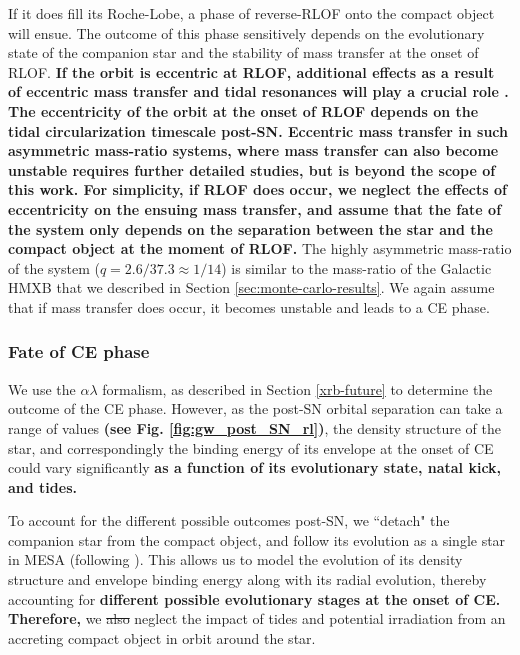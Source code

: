 \documentclass[linenumbers,trackchanges,twocolumn]{aastex701}
\begin{document}
If it does fill its Roche-Lobe, a phase of reverse-RLOF onto the compact object will ensue. The outcome of this phase sensitively depends on the evolutionary state of the companion star and the stability of mass transfer at the onset of RLOF. \textbf{If the orbit is eccentric at RLOF, additional effects as a result of eccentric mass transfer and tidal resonances will play a crucial role \citep{2007ApJ...667.1170S, 2009ApJ...702.1387S, 2010ApJ...724..546S, 2025ApJ...983...39R, 2025arXiv250905243P}. The eccentricity of the orbit at the onset of RLOF depends on the tidal circularization timescale post-SN. Eccentric mass transfer in such asymmetric mass-ratio systems, where mass transfer can also become unstable requires further detailed studies, but is beyond the scope of this work. For simplicity, if RLOF does occur, we neglect the effects of eccentricity on the ensuing mass transfer, and assume that the fate of the system only depends on the separation between the star and the compact object at the moment of RLOF.} The highly asymmetric mass-ratio of the system ($q = 2.6/37.3 \approx 1/14$) is similar to the mass-ratio of the Galactic HMXB that we described in Section \ref{sec:monte-carlo-results}. We again assume that if mass transfer does occur, it becomes unstable and leads to a CE phase.

\subsubsection{Fate of CE phase}

We use the $\alpha \lambda$ formalism, as described in Section
\ref{xrb-future} to determine the outcome of the CE phase. However, as
the post-SN orbital separation can take a range of values \textbf{(see Fig. \ref{fig:gw_post_SN_rl})}, the density
structure of the star, and correspondingly the binding energy of its
envelope at the onset of CE could vary significantly \textbf{as a function of its evolutionary state, natal kick, and tides.}

To account for the different possible outcomes post-SN, we ``detach" the companion star from the compact object, and follow its evolution as a single star in \textsc{MESA} (following \citealp{2021ApJ...923..277R,2023ApJ...942L..32R}). This allows us to model the evolution of its density structure and envelope binding energy along with its radial evolution, thereby accounting for \textbf{different possible evolutionary stages at the onset of CE.} \textbf{Therefore,} we \sout{also} neglect the impact of tides and potential irradiation from an accreting compact object in orbit around the star.
\end{document}
